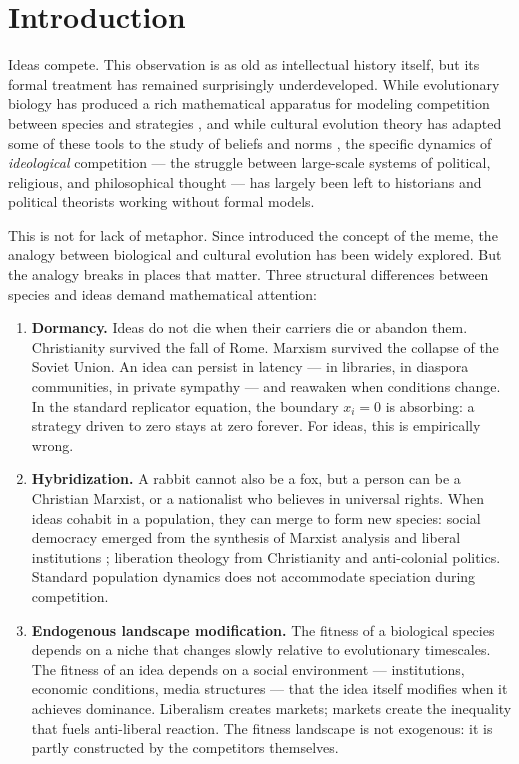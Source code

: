 \section{Introduction}
\label{sec:introduction}

Ideas compete. This observation is as old as intellectual history itself, but
its formal treatment has remained surprisingly underdeveloped. While
evolutionary biology has produced a rich mathematical apparatus for modeling
competition between species and strategies
\citep{hofbauer1998evolutionary,nowak2006evolutionary,weibull1995evolutionary},
and while cultural evolution theory has adapted some of these tools to the
study of beliefs and norms
\citep{cavalli1981cultural,boyd2005origin,mesoudi2011cultural}, the
specific dynamics of \emph{ideological} competition --- the struggle between
large-scale systems of political, religious, and philosophical thought ---
has largely been left to historians and political theorists working without
formal models.

This is not for lack of metaphor. Since \citet{dawkins1976selfish} introduced
the concept of the meme, the analogy between biological and cultural
evolution has been widely explored. But the analogy breaks in places that
matter. Three structural differences between species and ideas demand
mathematical attention:

\begin{enumerate}[label=(\roman*)]
  \item \textbf{Dormancy.} Ideas do not die when their carriers die or
  abandon them. Christianity survived the fall of Rome. Marxism survived the
  collapse of the Soviet Union. An idea can persist in latency --- in
  libraries, in diaspora communities, in private sympathy --- and reawaken
  when conditions change. In the standard replicator equation, the boundary
  $x_i = 0$ is absorbing: a strategy driven to zero stays at zero forever.
  For ideas, this is empirically wrong.

  \item \textbf{Hybridization.} A rabbit cannot also be a fox, but a person
  can be a Christian Marxist, or a nationalist who believes in universal
  rights. When ideas cohabit in a population, they can merge to form new
  species: social democracy emerged from the synthesis of Marxist analysis
  and liberal institutions \citep{berman2006primacy}; liberation theology
  from Christianity and anti-colonial politics. Standard population dynamics
  does not accommodate speciation during competition.

  \item \textbf{Endogenous landscape modification.} The fitness of a
  biological species depends on a niche that changes slowly relative to
  evolutionary timescales. The fitness of an idea depends on a social
  environment --- institutions, economic conditions, media structures ---
  that the idea itself modifies when it achieves dominance. Liberalism
  creates markets; markets create the inequality that fuels anti-liberal
  reaction. The fitness landscape is not exogenous: it is partly constructed
  by the competitors themselves.
\end{enumerate}

